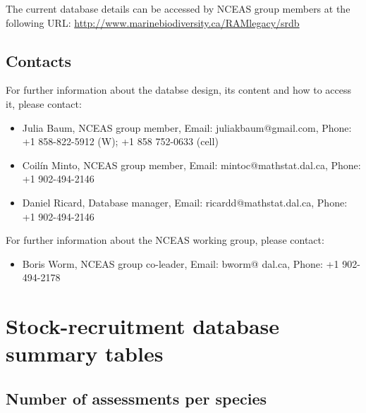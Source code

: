 \documentclass[a4paper,10pt,oneside]{book}
\begin{document}
The current database details can be accessed by NCEAS group members at the following URL:
\url{http://www.marinebiodiversity.ca/RAMlegacy/srdb}

\newpage



\section{Contacts}

For further information about the databse design, its content and how to access it, please contact:
\begin{itemize}
 \item Julia Baum, NCEAS group member, Email: juliakbaum@gmail.com, Phone: +1 858-822-5912 (W); +1 858 752-0633 (cell)
 \item Coil\'{i}n Minto, NCEAS group member, Email: mintoc@mathstat.dal.ca, Phone: +1 902-494-2146
 \item Daniel Ricard, Database manager, Email: ricardd@mathstat.dal.ca, Phone: +1 902-494-2146
\end{itemize}

For further information about the NCEAS working group, please contact:
\begin{itemize}
 \item Boris Worm, NCEAS group co-leader, Email: bworm@ dal.ca, Phone: +1 902-494-2178
\end{itemize}





\chapter{Stock-recruitment database summary tables}

\section{Number of assessments per species}
\end{document}
